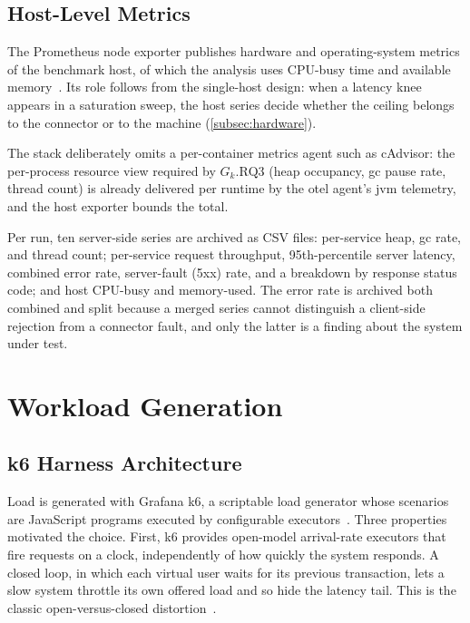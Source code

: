 \subsection{Host-Level Metrics}\label{subsec:host-metrics}

The Prometheus node exporter publishes hardware and operating-system metrics of the benchmark host, of which the analysis uses CPU-busy time and available memory~\citep{prometheusNodeExporter}. Its role follows from the single-host design: when a latency knee appears in a saturation sweep, the host series decide whether the ceiling belongs to the connector or to the machine (\cref{subsec:hardware}).

The stack deliberately omits a per-container metrics agent such as cAdvisor: the per-process resource view required by $G_k.\text{RQ}3$ (heap occupancy, \gls{gc} pause rate, thread count) is already delivered per runtime by the \gls{otel} agent's \gls{jvm} telemetry, and the host exporter bounds the total.

Per run, ten server-side series are archived as CSV files: per-service heap, \gls{gc} rate, and thread count; per-service request throughput, 95th-percentile server latency, combined error rate, server-fault (5xx) rate, and a breakdown by response status code; and host CPU-busy and memory-used. The error rate is archived both combined and split because a merged series cannot distinguish a client-side rejection from a connector fault, and only the latter is a finding about the system under test.


\section{Workload Generation}\label{sec:workload-gen}

\subsection{k6 Harness Architecture}\label{subsec:k6-harness}

Load is generated with Grafana k6, a scriptable load generator whose scenarios are JavaScript programs executed by configurable executors~\citep{k6docs}. Three properties motivated the choice. First, k6 provides open-model arrival-rate executors that fire requests on a clock, independently of how quickly the system responds. A closed loop, in which each virtual user waits for its previous transaction, lets a slow system throttle its own offered load and so hide the latency tail. This is the classic open-versus-closed distortion~\citep{schroeder2006open}.


